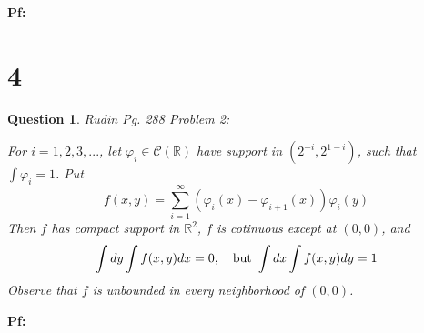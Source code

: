 \documentclass{article}
\newtheorem{question}{Question}
\begin{document}
\textbf{Pf:}

\break

\section*{4}
\begin{myBox}[]{}
    \begin{question}
        Rudin Pg. 288 Problem 2:

        For $i=1,2,3,...$, let $\varphi_i\in \mathcal{C}(\mathbb{R})$ have support in $(2^{-i},2^{1-i})$, such that $\int\varphi_i=1$. Put 
        $$f(x,y)=\sum_{i=1}^{\infty}(\varphi_i(x)-\varphi_{i+1}(x))\varphi_i(y)$$
        Then $f$ has compact support in $\mathbb{R}^2$, $f$ is cotinuous except at $(0,0)$, and 
        $$\int dy\int f(x,y)dx = 0,\quad \textmd{but } \int dx\int f(x,y)dy = 1$$
        Observe that $f$ is unbounded in every neighborhood of $(0,0)$.
    \end{question}
\end{myBox}

\textbf{Pf:}
\end{document}
